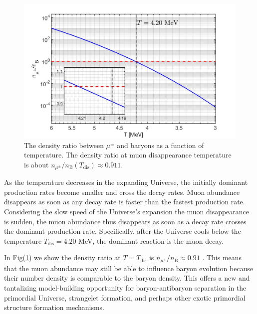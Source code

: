 \documentclass[universe,article,submit,moreauthors,pdftex,a4paper]{Definitions/mdpi}
\begin{document}
\begin{figure}[t]
\centering
\includegraphics[width=0.9\columnwidth]{DensityRatio_new2.jpg}
\caption{The density ratio between $\mu^\pm$ and baryons as a function of temperature. The density ratio at muon disappearance temperature is about $n_{\mu^\pm}/n_\mathrm{B}(T_\mathrm{dis})\approx0.911$.}
\label{muonRatio_fig} 
\end{figure}
As the temperature decreases in the expanding Universe, the initially dominant production rates become smaller and cross the decay rates. Muon abundance disappears as soon as any decay rate is faster than the fastest production rate. Considering the slow speed of the Universe's expansion the muon disappearance is sudden, the muon abundance thus disappears as soon as a decay rate crosses the dominant production rate. Specifically, after the Universe cools below the temperature $T_\mathrm{dis} = 4.20$ MeV, the dominant reaction is the muon decay.

In Fig(\ref{muonRatio_fig}) we show the density ratio at $T=T_\mathrm{dis}$ is $n_{\mu^\pm}/n_\mathrm{B}\approx0.91$ \cite{Yang:2021bko} . This means that the muon abundance may still be able to influence baryon evolution because their number density is comparable to the baryon density. This offers a new and tantalizing model-building opportunity for  baryon-antibaryon separation in the primordial Universe, strangelet formation, and perhaps other exotic primordial structure formation mechanisms.

\end{document}
